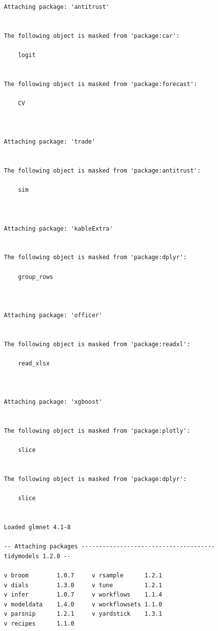 \documentclass[
  10pt,
]{article}
\begin{document}
\begin{verbatim}
Attaching package: 'antitrust'


The following object is masked from 'package:car':

    logit


The following object is masked from 'package:forecast':

    CV



Attaching package: 'trade'


The following object is masked from 'package:antitrust':

    sim



Attaching package: 'kableExtra'


The following object is masked from 'package:dplyr':

    group_rows



Attaching package: 'officer'


The following object is masked from 'package:readxl':

    read_xlsx



Attaching package: 'xgboost'


The following object is masked from 'package:plotly':

    slice


The following object is masked from 'package:dplyr':

    slice


Loaded glmnet 4.1-8

-- Attaching packages -------------------------------------- tidymodels 1.2.0 --

v broom        1.0.7     v rsample      1.2.1
v dials        1.3.0     v tune         1.2.1
v infer        1.0.7     v workflows    1.1.4
v modeldata    1.4.0     v workflowsets 1.1.0
v parsnip      1.2.1     v yardstick    1.3.1
v recipes      1.1.0     


\end{verbatim}
\end{document}
